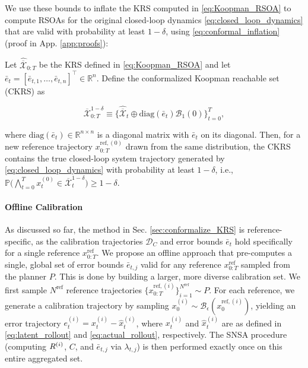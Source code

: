 \noindent We use these bounds to inflate the KRS computed in \eqref{eq:Koopman_RSOA} to compute RSOAs for the original closed-loop dynamics \eqref{eq:closed_loop_dynamics} that are valid with probability at least $1-\delta$, using \eqref{eq:conformal_inflation} (proof in App. \ref{app:proofs}):

\begingroup
\setlength{\abovedisplayskip}{6pt}
\setlength{\belowdisplayskip}{6pt}
\setcounter{theorem}{0}
\begin{theorem}
\label{thm:ckrs_coverage}
Let $\hat{\overline{\mathcal{X}}}_{0:T}$ be the KRS defined in \eqref{eq:Koopman_RSOA} and let $\bar e_t = [\bar e_{t,1}, \ldots, \bar e_{t,n}]^\top \in \mathbb{R}^n$. Define the conformalized Koopman reachable set (CKRS) as

\begin{equation}
\overline{\mathcal{X}}_{0:T}^{1-\delta} \equiv \bigl\{ \hat{\overline{\mathcal{X}}}_t \oplus \mathrm{diag}(\bar e_t) \mathcal{B}_1(0) \bigr\}_{t=0}^T,
\label{eq:conformal_inflation}
\end{equation}

\noindent where $\mathrm{diag}(\bar e_t) \in \mathbb{R}^{n\times n}$ is a diagonal matrix with $\bar e_t$ on its diagonal. Then, for a new reference trajectory $x_{0:T}^{\textrm{ref}, (0)}$ drawn from the same distribution, the CKRS contains the true closed-loop system trajectory generated by \eqref{eq:closed_loop_dynamics} with probability at least $1-\delta$, i.e., $\mathbb{P}\big( \bigwedge_{t=0}^T x_t^{(0)} \in \overline{\mathcal{X}}_t^{1-\delta} \big) \ge 1-\delta$.
\end{theorem}
\endgroup

\paragraph{Offline Calibration}
As discussed so far, the method in Sec. \ref{sec:conformalize_KRS} is reference-specific, as the calibration trajectories $\mathcal{D}_C$ and error bounds $\bar e_t$ hold specifically for a single reference $x_{0:T}^{\text{ref}}$. We propose an offline approach that pre-computes a single, global set of error bounds $\bar e_{t,j}$ valid for any reference $x_{0:T}^{\text{ref}}$ sampled from the planner $P$. This is done by building a larger, more diverse calibration set. We first sample $N^{\text{ref}}$ reference trajectories $\{x_{0:T}^{\text{ref},(i)}\}_{i=1}^{N^{\text{ref}}} \sim P$. For each reference, we generate a calibration trajectory by sampling $x_0^{(i)} \sim \mathcal{B}_\epsilon(x_{0}^{ \text{ref},(i)})$, yielding an error trajectory $e_t^{(i)} = x_t^{(i)} - \hat x_{t}^{(i)}$, where $x_t^{(i)}$ and $\hat x_{t}^{(i)}$ are as defined in \eqref{eq:latent_rollout} and \eqref{eq:actual_rollout}, respectively. The SNSA procedure (computing $R^{(i)}$, $C$, and $\bar e_{t,j}$ via $\lambda_{t,j}$) is then performed exactly once on this entire aggregated set.%

